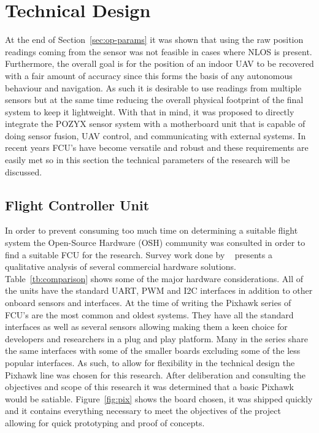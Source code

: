 \section{Technical Design}\label{sec:technical-design}
At the end of Section~\ref{sec:op-params} it was shown that using the raw position readings coming from the sensor was not feasible in cases where NLOS is present.
Furthermore, the overall goal is for the position of an indoor UAV to be recovered with a fair amount of accuracy since this forms the basis of any autonomous behaviour and navigation.
As such it is desirable to use readings from multiple sensors but at the same time reducing the overall physical footprint of the final system to keep it lightweight.
With that in mind, it was proposed to directly integrate the POZYX sensor system with a motherboard unit that is capable of doing sensor fusion, UAV control, and communicating with external systems.
In recent years FCU's have become versatile and robust and these requirements are easily met so in this section the technical parameters of the research will be discussed.

\subsection{Flight Controller Unit}\label{subsec:flight-controller-unit}
In order to prevent consuming too much time on determining a suitable flight system the Open-Source Hardware (OSH) community was consulted in order to find a suitable FCU for the research.
Survey work done by ~\citet{ebeid2018survey} presents a qualitative analysis of several commercial hardware solutions.
Table~\ref{tb:comparison} shows some of the major hardware considerations.
All of the units have the standard UART, PWM and I2C interfaces in addition to other onboard sensors and interfaces.
At the time of writing the Pixhawk series of FCU's are the most common and oldest systems.
They have all the standard interfaces as well as several sensors allowing making them a keen choice for developers and researchers in a plug and play platform.
Many in the series share the same interfaces with some of the smaller boards excluding some of the less popular interfaces.
As such, to allow for flexibility in the technical design the Pixhawk line was chosen for this research.
After deliberation and consulting the objectives and scope of this research it was determined that a basic Pixhawk would be satiable.
Figure~\ref{fig:pix} shows the board chosen, it was shipped quickly and it contains everything necessary to meet the objectives of the project allowing for quick prototyping and proof of concepts.

